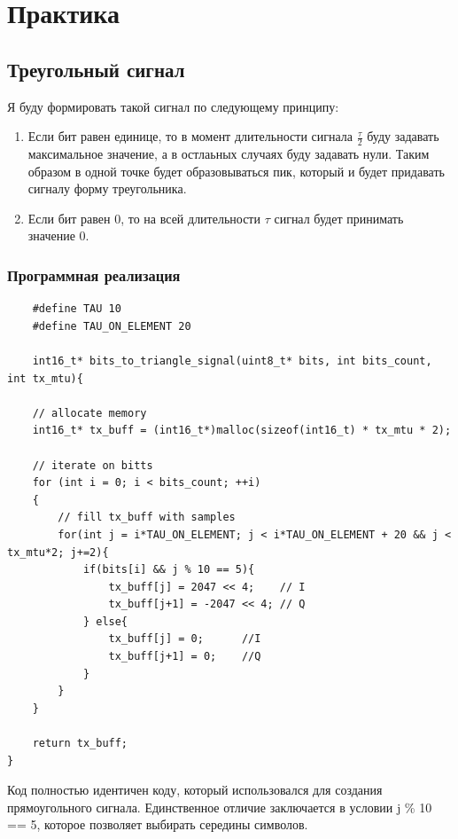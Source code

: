 \chapter{Практика}

\section{Треугольный сигнал}

Я буду формировать такой сигнал по следующему принципу:

\begin{enumerate}
    \item Если бит равен единице, то в момент длительности сигнала $\frac{\tau}{2}$ буду
    задавать максимальное значение, а в остлаьных случаях буду задавать нули. Таким образом в одной точке будет образовываться пик,
    который и будет придавать сигналу форму треугольника.
    \item Если бит равен 0, то на всей длительности $\tau$ сигнал будет принимать значение 0.
\end{enumerate}

\subsection{Программная реализация}

\begin{lstlisting}
    #define TAU 10
    #define TAU_ON_ELEMENT 20

    int16_t* bits_to_triangle_signal(uint8_t* bits, int bits_count, int tx_mtu){

    // allocate memory
    int16_t* tx_buff = (int16_t*)malloc(sizeof(int16_t) * tx_mtu * 2);

    // iterate on bitts
    for (int i = 0; i < bits_count; ++i)
    {   
        // fill tx_buff with samples
        for(int j = i*TAU_ON_ELEMENT; j < i*TAU_ON_ELEMENT + 20 && j < tx_mtu*2; j+=2){
            if(bits[i] && j % 10 == 5){
                tx_buff[j] = 2047 << 4;    // I
                tx_buff[j+1] = -2047 << 4; // Q
            } else{
                tx_buff[j] = 0;      //I
                tx_buff[j+1] = 0;    //Q
            }
        }
    }

    return tx_buff;
}
\end{lstlisting}

Код полностью идентичен коду, который использовался для создания прямоугольного сигнала. Единственное отличие заключается в 
условии j \% 10 == 5, которое позволяет выбирать середины символов.

